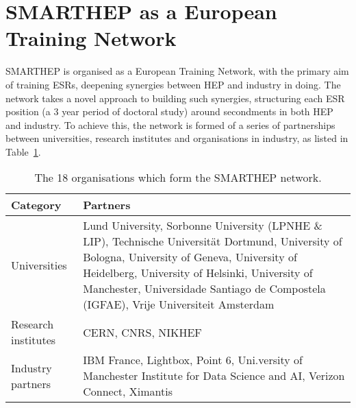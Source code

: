 \section{SMARTHEP as a European Training Network}
\label{network}
SMARTHEP is organised as a European Training Network, with the primary aim of training ESRs, deepening synergies between HEP and industry in doing. The network takes a novel approach to building such synergies, structuring each ESR position (a 3 year period of doctoral study) around secondments in both HEP and industry. To achieve this, the network is formed of a series of partnerships between universities, research institutes and organisations in industry, as listed in Table~\ref{partners}.\par
\begin{table}[h!]
    \centering
    \small
    \begin{tabular}{p{2.5cm}p{9.5cm}}
    \hline
    Category & Partners \\\hline
    Universities & Lund University, Sorbonne University (LPNHE \& LIP), Technische Universit\"at Dortmund, University of Bologna, University of Geneva, University of Heidelberg, University of Helsinki, University of Manchester, Universidade Santiago de Compostela (IGFAE), Vrije Universiteit Amsterdam \\\hline
    Research institutes & CERN, CNRS, NIKHEF  \\\hline
    Industry partners & IBM France, Lightbox, Point 6, Uni.versity of Manchester Institute for Data Science and AI, Verizon Connect, Ximantis\\\hline
    \end{tabular}
    \caption{The 18 organisations which form the SMARTHEP network.}
    \label{partners}       
\end{table}

